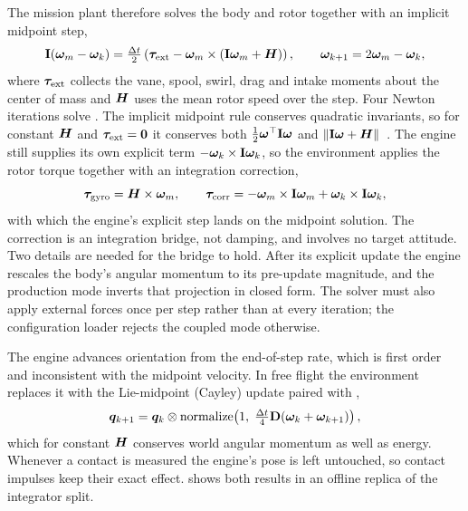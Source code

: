 \documentclass[10pt,letterpaper]{article}
\begin{document}
The mission plant therefore solves the body and rotor together with an implicit midpoint step,
\begin{equation}
\mathbf{I}(\bm{\omega}_m - \bm{\omega}_k) = \tfrac{\Delta t}{2}\left(\bm{\tau}_{\text{ext}} - \bm{\omega}_m\times(\mathbf{I}\bm{\omega}_m + \bm{H})\right), \qquad
\bm{\omega}_{k+1} = 2\bm{\omega}_m - \bm{\omega}_k ,
\label{eq:midpoint}
\end{equation}
where $\bm{\tau}_{\text{ext}}$ collects the vane, spool, swirl, drag and intake moments about the center of mass and $\bm{H}$ uses the mean rotor speed over the step.
Four Newton iterations solve .
The implicit midpoint rule conserves quadratic invariants, so for constant $\bm{H}$ and $\bm{\tau}_{\text{ext}} = \bm{0}$ it conserves both $\tfrac12\bm{\omega}^\top\mathbf{I}\bm{\omega}$ and $\|\mathbf{I}\bm{\omega} + \bm{H}\|$~\cite{hairer2006}.
The engine still supplies its own explicit term $-\bm{\omega}_k\times\mathbf{I}\bm{\omega}_k$, so the environment applies the rotor torque together with an integration correction,
\begin{equation}
\bm{\tau}_{\text{gyro}} = \bm{H}\times\bm{\omega}_m, \qquad
\bm{\tau}_{\text{corr}} = -\bm{\omega}_m\times\mathbf{I}\bm{\omega}_m + \bm{\omega}_k\times\mathbf{I}\bm{\omega}_k ,
\label{eq:correction}
\end{equation}
with which the engine's explicit step lands on the midpoint solution.
The correction is an integration bridge, not damping, and involves no target attitude.
Two details are needed for the bridge to hold.
After its explicit update the engine rescales the body's angular momentum to its pre-update magnitude, and the production mode inverts that projection in closed form.
The solver must also apply external forces once per step rather than at every iteration; the configuration loader rejects the coupled mode otherwise.

The engine advances orientation from the end-of-step rate, which is first order and inconsistent with the midpoint velocity.
In free flight the environment replaces it with the Lie-midpoint (Cayley) update paired with ,
\begin{equation}
\bm{q}_{k+1} = \bm{q}_k\otimes\mathrm{normalize}\!\left(1,\; \tfrac{\Delta t}{4}\mathbf{D}(\bm{\omega}_k + \bm{\omega}_{k+1})\right),
\label{eq:cayley}
\end{equation}
which for constant $\bm{H}$ conserves world angular momentum as well as energy.
Whenever a contact is measured the engine's pose is left untouched, so contact impulses keep their exact effect.
 shows both results in an offline replica of the integrator split.
\end{document}
